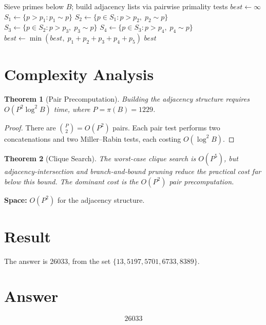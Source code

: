 \documentclass[12pt,a4paper]{article}
\newtheorem{theorem}{Theorem}
\theoremstyle{definition}
\theoremstyle{remark}
\begin{document}
\begin{algorithm}[H]
\caption{Find Minimum-Weight 5-Clique}
\begin{algorithmic}[1]
\State Sieve primes below $B$; build adjacency lists via pairwise primality tests
\State $\textit{best} \gets \infty$
    \State $S_1 \gets \{p > p_1 : p_1 \sim p\}$
        \State $S_2 \gets \{p \in S_1 : p > p_2,\; p_2 \sim p\}$
            \State $S_3 \gets \{p \in S_2 : p > p_3,\; p_3 \sim p\}$
                \State $S_4 \gets \{p \in S_3 : p > p_4,\; p_4 \sim p\}$
                    \State $\textit{best} \gets \min(\textit{best},\; p_1 + p_2 + p_3 + p_4 + p_5)$
                \EndFor
            \EndFor
        \EndFor
    \EndFor
\EndFor
\State \Return $\textit{best}$
\end{algorithmic}
\end{algorithm}

\section{Complexity Analysis}

\begin{theorem}[Pair Precomputation]
Building the adjacency structure requires $O(P^2 \log^2 B)$ time, where $P = \pi(B) = 1229$.
\end{theorem}

\begin{proof}
There are $\binom{P}{2} = O(P^2)$ pairs. Each pair test performs two concatenations and two Miller--Rabin tests, each costing $O(\log^2 B)$.
\end{proof}

\begin{theorem}[Clique Search]
The worst-case clique search is $O(P^5)$, but adjacency-intersection and branch-and-bound pruning reduce the practical cost far below this bound. The dominant cost is the $O(P^2)$ pair precomputation.
\end{theorem}

\noindent\textbf{Space:} $O(P^2)$ for the adjacency structure.

\section{Result}
The answer is $\boxed{26033}$, from the set $\{13, 5197, 5701, 6733, 8389\}$.

\section{Answer}

\[
\boxed{26033}
\]
\end{document}
